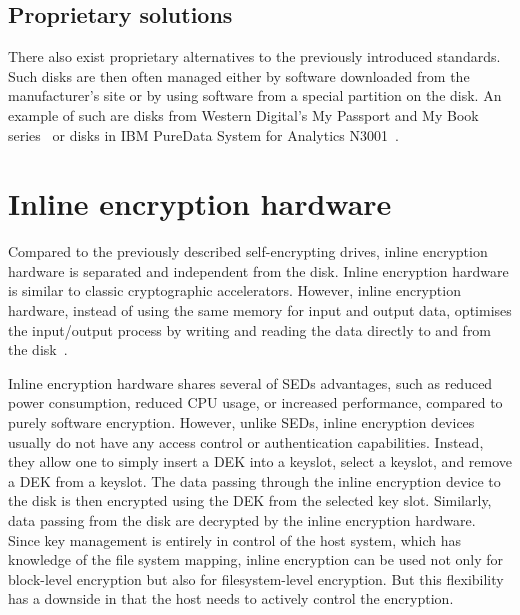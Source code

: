 
\subsection{Proprietary solutions}

There also exist proprietary alternatives to the previously introduced standards. Such disks are then often managed either by software downloaded from the manufacturer's site or by using software from a special partition on the disk.
An example of such are disks from Western Digital's My Passport and My Book series~\cite{got_hw_crypto} or disks in IBM PureData System for Analytics N3001~\cite{ibm_sed}.





\section{Inline encryption hardware}

Compared to the previously described self-encrypting drives, inline encryption hardware is separated and independent from the disk. Inline encryption hardware is similar to classic cryptographic accelerators. However, inline encryption hardware, instead of using the same memory for input and output data, optimises the input/output process by writing and reading the data directly to and from the disk~\cite{linux-doc-inline}.

Inline encryption hardware shares several of SEDs advantages, such as reduced power consumption, reduced CPU usage, or increased performance, compared to purely software encryption.
However, unlike SEDs, inline encryption devices usually do not have any access control or authentication capabilities. Instead, they allow one to simply insert a DEK into a keyslot, select a keyslot, and remove a DEK from a keyslot. The data passing through the inline encryption device to the disk is then encrypted using the DEK from the selected key slot. Similarly, data passing from the disk are decrypted by the inline encryption hardware.
Since key management is entirely in control of the host system, which has knowledge of the file system mapping, inline encryption can be used not only for block-level encryption but also for filesystem-level encryption. But this flexibility has a downside in that the host needs to actively control the encryption.

